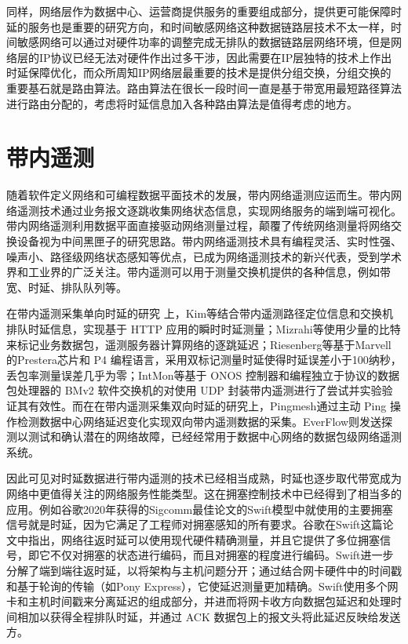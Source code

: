 同样，网络层作为数据中心、运营商提供服务的重要组成部分，提供更可能保障时延的服务也是重要的研究方向，和时间敏感网络这种数据链路层技术不太一样，时间敏感网络可以通过对硬件功率的调整完成无排队的数据链路层网络环境，但是网络层的IP协议已经无法对硬件作出过多干涉，因此需要在IP层独特的技术上作出时延保障优化，而众所周知IP网络层最重要的技术是提供分组交换，分组交换的重要基石就是路由算法。路由算法在很长一段时间一直是基于带宽用最短路径算法进行路由分配的，考虑将时延信息加入各种路由算法是值得考虑的地方。

\section{带内遥测}

随着软件定义网络和可编程数据平面技术的发展，带内网络遥测应运而生。带内网络遥测技术通过业务报文逐跳收集网络状态信息，实现网络服务的端到端可视化。带内网络遥测利用数据平面直接驱动网络测量过程，颠覆了传统网络测量将网络交换设备视为中间黑匣子的研究思路。带内网络遥测技术具有编程灵活、实时性强、噪声小、路径级网络状态感知等优点，已成为网络遥测技术的新兴代表，受到学术界和工业界的广泛关注。带内遥测可以用于测量交换机提供的各种信息，例如带宽、时延、排队队列等。

在带内遥测采集单向时延的研究 \cite{INTSURVEY} 上，Kim等结合带内遥测路径定位信息和交换机排队时延信息，实现基于 \gls*{HTTP} 应用的瞬时时延测量；Mizrahi等使用少量的比特来标记业务数据包，遥测服务器计算网络的逐跳延迟；Riesenberg等基于Marvell的Prestera芯片和 \gls*{P4} 编程语言，采用双标记测量时延使得时延误差小于100纳秒，丢包率测量误差几乎为零；IntMon等基于 \gls*{ONOS} 控制器和编程独立于协议的数据包处理器的 \gls*{BMv2} 软件交换机的对使用 \gls*{UDP} 封装带内遥测进行了尝试并实验验证其有效性。而在在带内遥测采集双向时延的研究上，Pingmesh通过主动 \gls*{Ping} 操作检测数据中心网络延迟变化实现双向带内遥测数据的采集。EverFlow则发送探测以测试和确认潜在的网络故障，已经经常用于数据中心网络的数据包级网络遥测系统。

因此可见对时延数据进行带内遥测的技术已经相当成熟，时延也逐步取代带宽成为网络中更值得关注的网络服务性能类型。这在拥塞控制技术中已经得到了相当多的应用。例如谷歌2020年获得的Sigcomm最佳论文的Swift模型中就使用的主要拥塞信号就是时延，因为它满足了工程师对拥塞感知的所有要求。谷歌在Swift这篇论文中指出，网络往返时延可以使用现代硬件精确测量，并且它提供了多位拥塞信号，即它不仅对拥塞的状态进行编码，而且对拥塞的程度进行编码。Swift进一步分解了端到端往返时延，以将架构与主机问题分开；通过结合网卡硬件中的时间戳和基于轮询的传输（如Pony Express），它使延迟测量更加精确。Swift使用多个网卡和主机时间戳来分离延迟的组成部分，并进而将网卡收方向数据包延迟和处理时间相加以获得全程排队时延，并通过 \gls*{ACK} 数据包上的报文头将此延迟反映给发送方。


